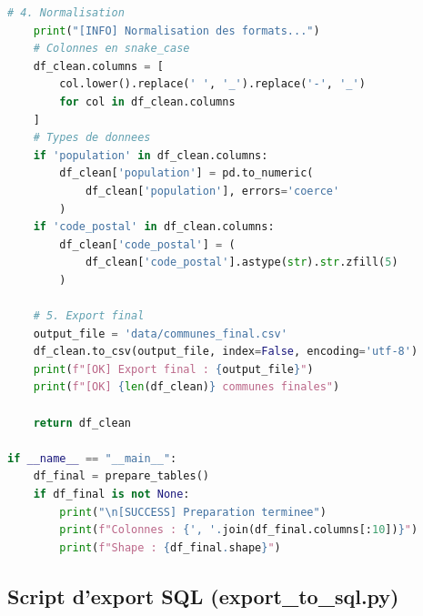 \documentclass[12pt,a4paper]{article}
\begin{document}
\begin{lstlisting}[language=Python]
    # 4. Normalisation
    print("[INFO] Normalisation des formats...")
    # Colonnes en snake_case
    df_clean.columns = [
        col.lower().replace(' ', '_').replace('-', '_')
        for col in df_clean.columns
    ]
    # Types de donnees
    if 'population' in df_clean.columns:
        df_clean['population'] = pd.to_numeric(
            df_clean['population'], errors='coerce'
        )
    if 'code_postal' in df_clean.columns:
        df_clean['code_postal'] = (
            df_clean['code_postal'].astype(str).str.zfill(5)
        )

    # 5. Export final
    output_file = 'data/communes_final.csv'
    df_clean.to_csv(output_file, index=False, encoding='utf-8')
    print(f"[OK] Export final : {output_file}")
    print(f"[OK] {len(df_clean)} communes finales")

    return df_clean

if __name__ == "__main__":
    df_final = prepare_tables()
    if df_final is not None:
        print("\n[SUCCESS] Preparation terminee")
        print(f"Colonnes : {', '.join(df_final.columns[:10])}")
        print(f"Shape : {df_final.shape}")
\end{lstlisting}

\subsection{Script d'export SQL (export\_to\_sql.py)}
\label{annexe:export_sql}
\end{document}
